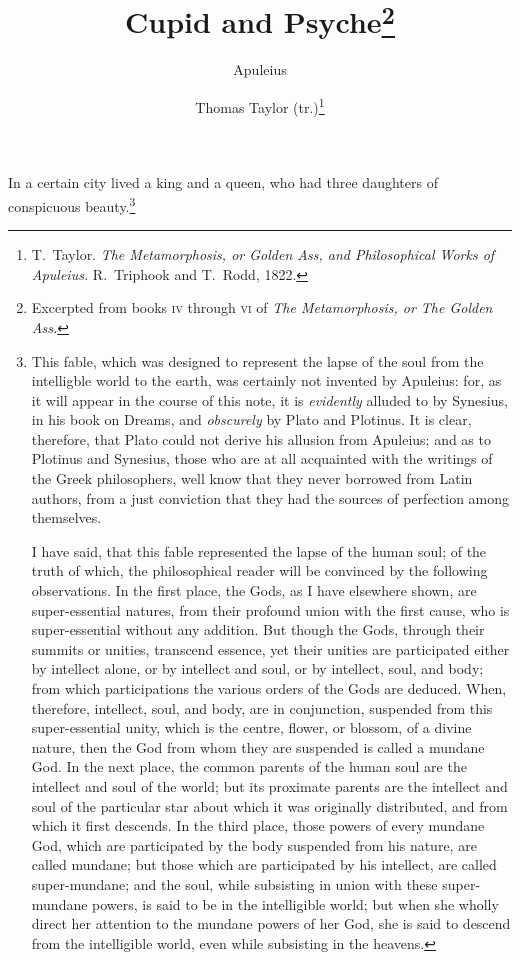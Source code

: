 \documentclass[12pt]{article}
\title{\Huge\swshape Cupid and Psyche\footnote{Excerpted from books \textsc{iv}
through \textsc{vi} of \textit{The Metamorphosis, or The Golden Ass.}}}
\author{Apuleius \and Thomas Taylor (tr.)\footnote{T.~Taylor. \textit{The
Metamorphosis, or Golden Ass, and Philosophical Works of Apuleius.} R.~Triphook
and T.~Rodd, 1822.}}
\date{}
\begin{document}
\maketitle

\noindent In a certain city lived a king and a queen, who had three daughters
of conspicuous beauty.\footnote{This fable, which was designed to represent the
lapse of the soul from the intelligble world to the earth, was certainly not
invented by Apuleius: for, as it will appear in the course of this note, it is
\textit{evidently} alluded to by Synesius, in his book on Dreams, and
\textit{obscurely} by Plato and Plotinus. It is clear, therefore, that Plato
could not derive his allusion from Apuleius; and as to Plotinus and Synesius,
those who are at all acquainted with the writings of the Greek philosophers,
well know that they never borrowed from Latin authors, from a just conviction
that they had the sources of perfection among themselves.

I have said, that this fable represented the lapse of the human soul; of the
truth of which, the philosophical reader will be convinced by the following
observations. In the first place, the Gods, as I have elsewhere shown, are
super-essential natures, from their profound union with the first cause, who is
super-essential without any addition. But though the Gods, through their
summits or unities, transcend essence, yet their unities are participated
either by intellect alone, or by intellect and soul, or by intellect, soul, and
body; from which participations the various orders of the Gods are deduced.
When, therefore, intellect, soul, and body, are in conjunction, suspended from
this super-essential unity, which is the centre, flower, or blossom, of a
divine nature, then the God from whom they are suspended is called a mundane
God. In the next place, the common parents of the human soul are the intellect
and soul of the world; but its proximate parents are the intellect and soul of
the particular star about which it was originally distributed, and from which
it first descends. In the third place, those powers of every mundane God, which
are participated by the body suspended from his nature, are called mundane; but
those which are participated by his intellect, are called super-mundane; and
the soul, while subsisting in union with these super-mundane powers, is said to
be in the intelligible world; but when she wholly direct her attention to the
mundane powers of her God, she is said to descend from the intelligible world,
even while subsisting in the heavens.

}
\end{document}
